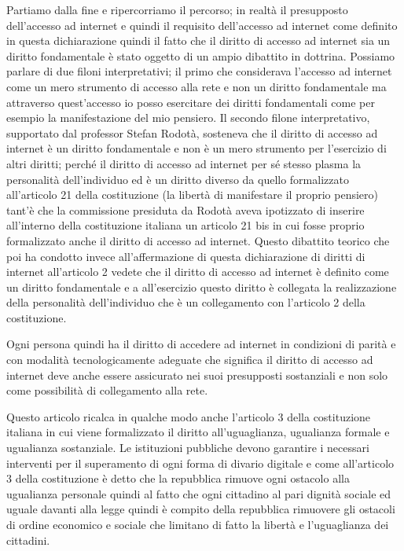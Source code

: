 Partiamo dalla fine e ripercorriamo il percorso; in realtà il presupposto dell'accesso ad internet e quindi il requisito dell'accesso ad internet come definito in questa dichiarazione quindi il fatto che il diritto di accesso ad internet sia un diritto fondamentale è stato oggetto di un ampio dibattito in dottrina.
Possiamo parlare di due filoni interpretativi; il primo che considerava l'accesso ad internet come un mero strumento di accesso alla rete e non un diritto fondamentale ma attraverso quest'accesso io posso esercitare dei diritti fondamentali come per esempio la manifestazione del mio pensiero.
Il secondo filone interpretativo, supportato dal professor Stefan Rodotà, sosteneva che il diritto di accesso ad internet è un diritto fondamentale e non è un mero strumento per l'esercizio di altri diritti; perché il diritto di accesso ad internet per sé stesso plasma la personalità dell'individuo ed è un diritto diverso da quello formalizzato all'articolo 21 della costituzione (la libertà di manifestare il proprio pensiero) tant'è che la commissione presiduta da Rodotà aveva ipotizzato di inserire all'interno della costituzione italiana un articolo 21 bis in cui fosse proprio formalizzato anche il diritto di accesso ad internet.
Questo dibattito teorico che poi ha condotto invece all'affermazione di questa dichiarazione di diritti di internet all'articolo 2  vedete che il diritto di accesso ad internet è definito come un diritto fondamentale e a all'esercizio questo diritto è collegata la realizzazione della personalità dell'individuo che è un collegamento con l'articolo 2 della costituzione.

Ogni persona quindi ha il diritto di accedere ad internet in condizioni di parità e con modalità tecnologicamente adeguate che significa il diritto di accesso ad internet deve anche essere assicurato nei suoi presupposti sostanziali e non solo come possibilità di collegamento alla rete.

Questo articolo ricalca in qualche modo anche l'articolo 3 della costituzione italiana in cui viene formalizzato il diritto all'uguaglianza, ugualianza formale e ugualianza sostanziale.
Le istituzioni pubbliche devono garantire i necessari interventi per il superamento di ogni forma di divario digitale e come all'articolo 3 della costituzione è detto che la repubblica rimuove ogni ostacolo alla ugualianza personale quindi al fatto che ogni cittadino al pari dignità sociale ed uguale davanti alla legge quindi è compito della repubblica rimuovere gli ostacoli di ordine economico e sociale che limitano di fatto la libertà e l'uguaglianza dei cittadini.

